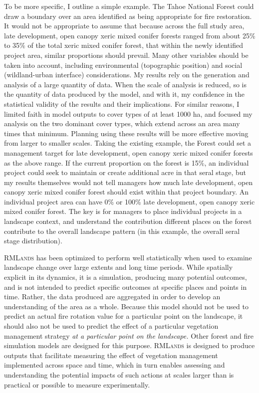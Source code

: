 To be more specific, I outline a simple example. The Tahoe National Forest could draw a boundary over an area identified as being appropriate for fire restoration. It would not be appropriate to assume that because across the full study area, late development, open canopy xeric mixed conifer forests ranged from about 25\% to 35\% of the total xeric mixed conifer forest, that within the newly identified project area, similar proportions should prevail. Many other variables should be taken into account, including environmental (topographic position) and social (wildland-urban interface) considerations. My results rely on the generation and analysis of a large quantity of data. When the scale of analysis is reduced, so is the quantity of data produced by the model, and with it, my confidence in the statistical validity of the results and their implications. For similar reasons, I limited faith in model outputs to cover types of at least 1000 ha, and focused my analysis on the two dominant cover types, which extend across an area many times that minimum. Planning using these results will be more effective moving from larger to smaller scales. Taking the existing example, the Forest could set a management target for late development, open canopy xeric mixed conifer forests as the above range. If the current proportion on the forest is 15\%, an individual project could seek to maintain or create additional acre in that seral stage, but my results themselves would not tell managers how much late development, open canopy xeric mixed conifer forest should exist within that project boundary. An individual project area can have 0\% or 100\% late development, open canopy xeric mixed conifer forest. The key is for managers to place individual projects in a landscape context, and understand the contribution different places on the forest contribute to the overall landscape pattern (in this example, the overall seral stage distribution).

\textsc{RMLands} has been optimized to perform well statistically when used to examine landscape change over large extents and long time periods. While spatially explicit in its dynamics, it is a simulation, producing many potential outcomes, and is not intended to predict specific outcomes at specific places and points in time. Rather, the data produced are aggregated in order to develop an understanding of the area as a whole. Because this model should not be used to predict an actual fire rotation value for a particular point on the landscape, it should also not be used to predict the effect of a particular vegetation management strategy \emph{at a particular point on the landscape.} Other forest and fire simulation models are designed for this purpose. \textsc{RMLands} is designed to produce outputs that facilitate measuring the effect of vegetation management implemented across space and time, which in turn enables assessing and understanding the potential impacts of such actions at scales larger than is practical or possible to measure experimentally.  

